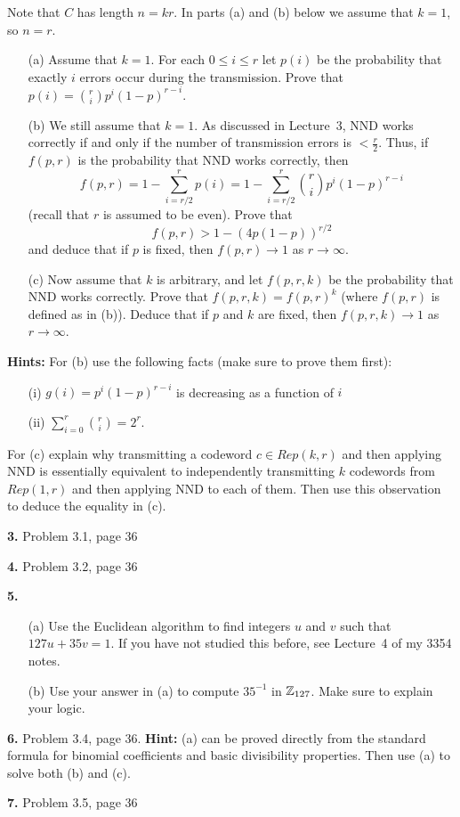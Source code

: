 \documentclass[12pt]{amsart}
\begin{document}
Note that $C$ has length $n=kr$. In parts (a) and (b) below we assume that $k=1$, so $n=r$.
\begin{itemize}
\item[(a)] Assume that $k=1$. For each $0\leq i\leq r$ let $p(i)$ be the probability that exactly $i$ errors occur during the transmission. Prove that 
$p(i)={r\choose i} p^i (1-p)^{r-i}$.
\item[(b)] We still assume that $k=1$. As discussed in Lecture~3, NND works correctly
if and only if the number of transmission errors is $<\frac{r}{2}$. Thus, if
$f(p,r)$ is the probability that NND works correctly, then
$$f(p,r)=1-\sum\limits_{i=r/2}^r p(i)=1-\sum\limits_{i=r/2}^r {r\choose i} p^i (1-p)^{r-i}$$
(recall that $r$ is assumed to be even).
Prove that $$f(p,r)>1-(4p(1-p))^{r/2}$$ and deduce that if $p$ is fixed,
then $f(p,r)\to 1$ as $r\to\infty$. 
\item[(c)] Now assume that $k$ is arbitrary, and let $f(p,r,k)$ be the probability
that NND works correctly. Prove that $f(p,r,k)=f(p,r)^k$ (where $f(p,r)$ is defined as in (b)). Deduce that if $p$ and $k$ are fixed, then $f(p,r,k)\to 1$ as $r\to\infty$.
\end{itemize}
{\bf Hints:} For (b) use the following facts (make sure to prove them first):
\begin{itemize}
\item[(i)] $g(i)=p^i (1-p)^{r-i}$ is decreasing as a function of $i$
\item[(ii)] $\sum\limits_{i=0}^r {r\choose i}=2^r$.
\end{itemize}
For (c) explain why transmitting a codeword $c\in Rep(k,r)$ and then applying NND is essentially equivalent to independently transmitting $k$ codewords from $Rep(1,r)$ and then applying NND to each of them. Then use this observation to deduce the equality in (c).

{\bf 3.} Problem 3.1, page 36

{\bf 4.} Problem 3.2, page 36

{\bf 5.} 
\begin{itemize}
\item[(a)] Use the Euclidean algorithm to find integers $u$ and $v$ such that $127u+35v=1$. If you have not studied this before, see Lecture~4 of my 3354 notes.
\item[(b)] Use your answer in (a) to compute $35^{-1}$ in ${\mathbb Z}_{127}$. Make sure to explain your logic.
\end{itemize}

{\bf 6.} Problem 3.4, page 36. {\bf Hint:} (a) can be proved directly from the standard formula for binomial coefficients and
basic divisibility properties. Then use (a) to solve both (b) and (c).

{\bf 7.} Problem 3.5, page 36
\end{document}
